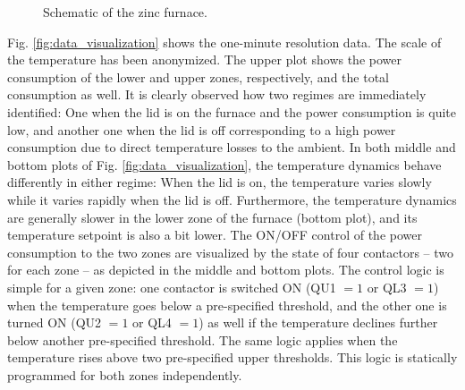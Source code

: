 \documentclass[conference]{IEEEtran}
\begin{document}
\begin{figure}[t]
    \centering
    \begin{adjustbox}{width=0.55\columnwidth}
        
    \end{adjustbox}
    \caption{\small{Schematic of the zinc furnace. 
            \vspace{-3mm}
    }}
    \label{fig:furnace_schematic_tikz}
\end{figure}

Fig. \ref{fig:data_visualization} shows the one-minute resolution data. The scale of the temperature has been anonymized. The upper plot shows the power consumption of the lower and upper zones, respectively, and the total consumption as well. It is clearly observed how two regimes are immediately identified: One when the lid is on the furnace and the power consumption is quite low, and another one when the lid is off corresponding to a high power consumption due to direct temperature losses to the ambient. In both middle and bottom plots of Fig. \ref{fig:data_visualization}, the temperature dynamics behave differently in either regime: When the lid is on, the temperature varies slowly while it varies rapidly when the lid is off. Furthermore, the temperature dynamics are generally slower in the lower zone of the furnace (bottom plot), and its temperature setpoint is also a bit lower. The ON/OFF control of the power consumption to the two zones are visualized by the state of four contactors -- two for each zone -- as depicted in the middle and bottom plots. The control logic is simple for a given zone: one contactor is switched ON (QU1 $=1$ or QL3 $=1$) when the temperature goes below a pre-specified threshold, and the other one is turned ON (QU2 $=1$ or QL4 $=1$) as well if the temperature declines further below another pre-specified threshold. The same logic applies when the temperature rises above two pre-specified upper thresholds. This logic is statically programmed for both zones independently.
\end{document}
